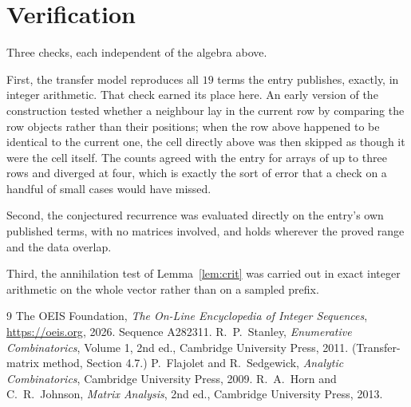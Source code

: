 \documentclass[11pt,a4paper]{article}
\theoremstyle{plain}
\theoremstyle{definition}
\begin{document}
\section{Verification}

Three checks, each independent of the algebra above.

First, the transfer model reproduces all $19$ terms the entry publishes, exactly, in
integer arithmetic. That check earned its place here. An early version of the construction
tested whether a neighbour lay in the current row by comparing the row objects rather
than their positions; when the row above happened to be identical to the current one, the
cell directly above was then skipped as though it were the cell itself. The counts agreed with
the entry for arrays of up to three rows and diverged at four, which is exactly the sort of
error that a check on a handful of small cases would have missed.

Second, the conjectured recurrence was evaluated directly on the entry's own published terms,
with no matrices involved, and holds wherever the proved range and the data overlap.

Third, the annihilation test of Lemma~\ref{lem:crit} was carried out in exact integer
arithmetic on the whole vector rather than on a sampled prefix.

\begin{thebibliography}{9}
 The OEIS Foundation, \emph{The On-Line Encyclopedia of Integer
Sequences}, \url{https://oeis.org}, 2026. Sequence A282311.
 R.~P.~Stanley, \emph{Enumerative Combinatorics}, Volume 1, 2nd ed.,
Cambridge University Press, 2011. (Transfer-matrix method, Section 4.7.)
 P.~Flajolet and R.~Sedgewick, \emph{Analytic Combinatorics}, Cambridge
University Press, 2009.
 R.~A.~Horn and C.~R.~Johnson, \emph{Matrix Analysis}, 2nd ed., Cambridge
University Press, 2013.
\end{thebibliography}
\end{document}
